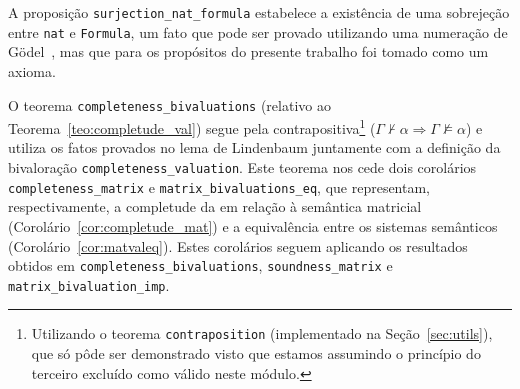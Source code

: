         A proposição \texttt{surjection\_nat\_formula} estabelece a existência de uma sobrejeção entre \texttt{nat} e \texttt{Formula}, um fato que pode ser provado utilizando uma numeração de G{\"o}del~\cite{sep-goedel-incompleteness}, mas que para os propósitos do presente trabalho foi tomado como um axioma.

        O teorema \texttt{completeness\_bivaluations} (relativo ao Teorema~\ref{teo:completude_val}) segue pela contrapositiva\footnote{Utilizando o teorema \texttt{contraposition} (implementado na Seção~\ref{sec:utils}), que só pôde ser demonstrado visto que estamos assumindo o princípio do terceiro excluído como válido neste módulo.} ($\Gamma \nvdash \alpha \Longrightarrow \Gamma \nvDash \alpha$) e utiliza os fatos provados no lema de Lindenbaum juntamente com a definição da bivaloração \texttt{completeness\_valuation}. Este teorema nos cede dois corolários \texttt{completeness\_matrix} e \texttt{matrix\_bivaluations\_eq}, que representam, respectivamente, a completude da \lfium{} em relação à semântica matricial (Corolário~\ref{cor:completude_mat}) e a equivalência entre os sistemas semânticos (Corolário~\ref{cor:matvaleq}). Estes corolários seguem aplicando os resultados obtidos em \texttt{completeness\_bivaluations}, \texttt{soundness\_matrix} e \texttt{matrix\_bivaluation\_imp}.